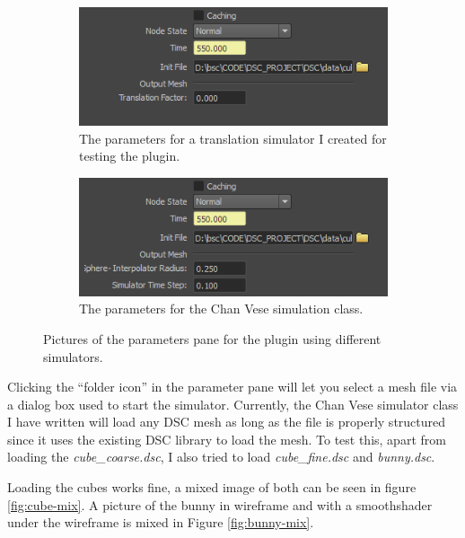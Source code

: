\begin{figure}
        \centering
        \begin{subfigure}[b]{0.48\textwidth}
                \includegraphics[width=\textwidth]{img/args0.png}
                \caption{The parameters for a translation simulator I created
                         for testing the plugin.}
                \label{fig:args0}
        \end{subfigure}%
        \hspace{10px} %
        \begin{subfigure}[b]{0.48\textwidth}
                \includegraphics[width=\textwidth]{img/args1.png}
                \caption{The parameters for the Chan Vese simulation class.}
                \label{fig:args1}
        \end{subfigure}
        \caption{Pictures of the parameters pane for the plugin using different
                 simulators.}
        \label{fig:args}
\end{figure}

Clicking the ``folder icon'' in the parameter pane will let you select a mesh
file via a dialog box used to start the simulator. Currently, the Chan Vese
simulator class I have written will load any DSC mesh as long as the file is
properly structured since it uses the existing DSC library to load the mesh.
To test this, apart from loading the \textit{cube\_coarse.dsc}, I also tried to
load \textit{cube\_fine.dsc} and \textit{bunny.dsc}.

Loading the cubes works fine, a mixed image of both can be seen in figure
\ref{fig:cube-mix}. A picture of the bunny in wireframe and with a
smoothshader under the wireframe is mixed in Figure \ref{fig:bunny-mix}.

